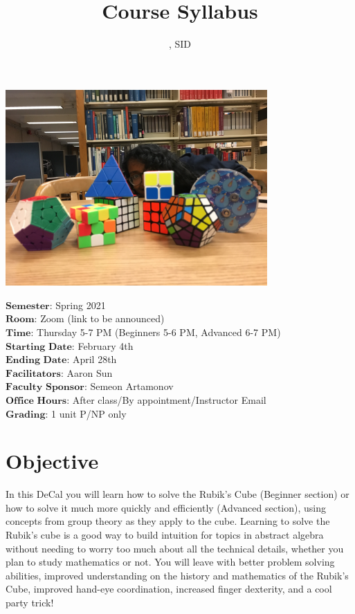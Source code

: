 \documentclass[11pt]{article}
\author{\Name, SID \SID}
\date{}
\begin{document}
\maketitle
\title{Course Syllabus}
\centerline{\includegraphics[width=10cm]{5.JPG}}

$\textbf{Semester}$: Spring 2021\\
$\textbf{Room}$: Zoom (link to be announced)\\
$\textbf{Time}$: Thursday 5-7 PM (Beginners 5-6 PM, Advanced 6-7 PM)\\
$\textbf{Starting Date}$: February 4th\\
$\textbf{Ending Date}$: April 28th\\
$\textbf{Facilitators}$: Aaron Sun\\
$\textbf{Faculty Sponsor}$: Semeon Artamonov\\
$\textbf{Office Hours}$: After class/By appointment/Instructor Email \\
$\textbf{Grading}$: 1 unit P/NP only

\section*{Objective}
In this DeCal you will learn how to solve the Rubik’s Cube (Beginner section) or how to solve it much more quickly and efficiently (Advanced section), using concepts from group theory as they apply to the cube. Learning to solve the Rubik's cube is a good way to build intuition for topics in abstract algebra without needing to worry too much about all the technical details, whether you plan to study mathematics or not. You will leave with better problem solving abilities, improved understanding on the history and mathematics of the Rubik’s Cube, improved hand-eye coordination, increased finger dexterity, and a cool party trick!
\end{document}
